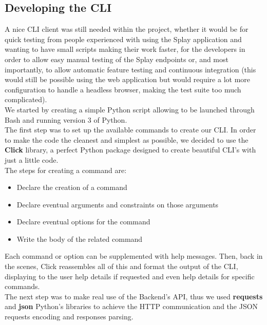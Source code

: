 \documentclass{eplmastersthesis}
\begin{document}
      \subsection{Developing the CLI}

        A nice CLI client was still needed within the project, whether it
        would be for quick testing from people experienced with using the
        Splay application and wanting to have small scripts making their
        work faster, for the developers in order to allow easy manual testing
        of the Splay endpoints or, and most importantly, to allow automatic
        feature testing and continuous integration (this would still be
        possible using the web application but would require a lot more
        configuration to handle a headless browser, making the test suite
        too much complicated).\\

        We started by creating a simple Python script allowing to be launched
        through Bash and running version 3 of Python.\\

        The first step was to set up the available commands to create our CLI.
        In order to make the code the cleanest and simplest as possible, we
        decided to use the \textbf{Click} \cite{click} library, a perfect
        Python package designed to create beautiful CLI's with just a little
        code.\\
        The steps for creating a command are:

        \begin{itemize}
          \item Declare the creation of a command
          \item Declare eventual arguments and constraints on those arguments
          \item Declare eventual options for the command
          \item Write the body of the related command
        \end{itemize}

        Each command or option can be supplemented with help messages. Then,
        back in the scenes, Click reassembles all of this and format the
        output of the CLI, displaying to the user help details if requested
        and even help details for specific commands.\\

        The next step was to make real use of the Backend's API, thus we used
        \textbf{requests} \cite{requests} and \textbf{json} Python's libraries to
        achieve the HTTP communication and the JSON requests encoding and
        responses parsing.\\
\end{document}
